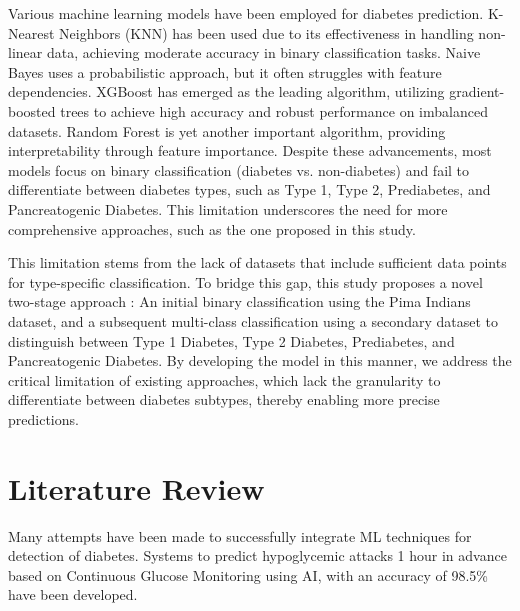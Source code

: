 \documentclass{article}
\begin{document}
\begin{multicols}{2}

Various machine learning models have been employed for diabetes prediction. 
K-Nearest Neighbors (KNN) has been used due to its effectiveness in handling non-linear data, achieving moderate accuracy in binary classification tasks. 
Naive Bayes uses a probabilistic approach, but it often struggles with feature dependencies. 
XGBoost has emerged as the leading algorithm, utilizing gradient-boosted trees to achieve high accuracy and robust performance on imbalanced datasets. 
Random Forest is yet another important algorithm, providing interpretability through feature importance.
Despite these advancements, most models focus on binary classification (diabetes vs. non-diabetes) and fail to differentiate between diabetes types, such as Type 1, Type 2, Prediabetes, and Pancreatogenic Diabetes.
This limitation underscores the need for more comprehensive approaches, such as the one proposed in this study.

This limitation stems from the lack of datasets that include sufficient data points for type-specific classification. To bridge this gap, this study proposes a novel two-stage approach :
An initial binary classification using the Pima Indians dataset, and a subsequent multi-class classification using a secondary dataset to distinguish between Type 1 Diabetes, Type 2 Diabetes, Prediabetes, and Pancreatogenic Diabetes.
By developing the model in this manner, we address the critical limitation of existing approaches, which lack the granularity to differentiate between diabetes subtypes, thereby enabling more precise predictions.

\section{Literature Review}

Many attempts have been made to successfully integrate ML techniques for detection of diabetes. Systems to predict hypoglycemic attacks 1 hour in advance based on Continuous Glucose Monitoring using AI, with an accuracy of 98.5\% have been developed\cite{nomura2021artificial}.

%
%
%
\fontsize{8}{2}\selectfont



\end{multicols}
\end{document}
